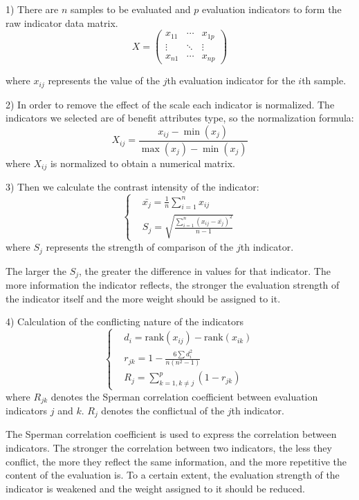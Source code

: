 \documentclass{mcmthesis}
\begin{document}
1) There are $n$ samples to be evaluated and $p$ evaluation indicators to form the raw indicator
data matrix.
\[
X = \begin{pmatrix}
x_{11} & \cdots & x_{1p} \\
\vdots & \ddots & \vdots \\
x_{n1} & \cdots & x_{np}
\end{pmatrix}
\]

where $x_{ij}$ represents the value of the $j$th evaluation indicator for the $i$th sample.

2) In order to remove the effect of the scale each indicator is normalized. The indicators
we selected are of benefit attributes type, so the normalization formula:
\[
X_{ij} = \frac{x_{ij}-\min(x_j)}{\max(x_j)-\min(x_j)}
\]
\noindent where $X_{ij}$ is normalized to obtain a numerical matrix.

3) Then we calculate the contrast intensity of the indicator:
\[
\left\{
\begin{aligned}
& \bar{x_j} = \frac{1}{n}\sum_{i=1}^{n} x_{ij} \\
& S_j = \sqrt{\frac{\sum_{i=1}^{n}(x_{ij}-\bar{x_j})^2}{n-1}}
\end{aligned}
\right.
\]
\noindent where $S_j$ represents the strength of comparison of the $j$th indicator.

The larger the $S_j$, the greater the difference in values for that indicator. The more information
the indicator reflects, the stronger the evaluation strength of the indicator itself and
the more weight should be assigned to it.

4) Calculation of the conflicting nature of the indicators
\[
\left\{
\begin{aligned}
& d_i = \mathrm{rank}(x_{ij})- \mathrm{rank}(x_{ik}) \\
& r_{jk} = 1-\frac{6 \sum d_i^2}{n (n^2-1)} \\
& R_j = \sum_{k=1,k\neq j}^p (1-r_{jk})
\end{aligned}
\right.
\]
\noindent where $R_{jk}$ denotes the Sperman correlation coefficient between evaluation indicators $j$ and
$k$. $R_j$ denotes the conflictual of the $j$th indicator.

The Sperman correlation coefficient is used to express the correlation between indicators.
The stronger the correlation between two indicators, the less they conflict, the more they reflect
the same information, and the more repetitive the content of the evaluation is. To a certain
extent, the evaluation strength of the indicator is weakened and the weight assigned to it should
be reduced.
\end{document}
